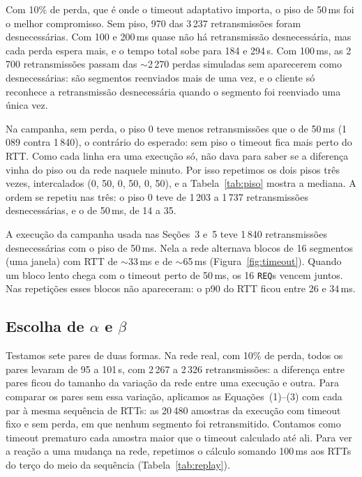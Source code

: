 \documentclass[11pt,a4paper]{article}
\begin{document}
Com 10\% de perda, que é onde o timeout adaptativo importa, o piso de 50\,ms
foi o melhor compromisso. Sem piso, 970 das 3\,237 retransmissões foram
desnecessárias. Com 100 e 200\,ms quase não há retransmissão desnecessária,
mas cada perda espera mais, e o tempo total sobe para 184 e 294\,s. Com
100\,ms, as 2\,700 retransmissões passam das $\sim$2\,270 perdas simuladas sem
aparecerem como desnecessárias: são segmentos reenviados mais de uma vez, e o
cliente só reconhece a retransmissão desnecessária quando o segmento foi
reenviado uma única vez.

Na campanha, sem perda, o piso 0 teve menos retransmissões que o de 50\,ms
(1\,089 contra 1\,840), o contrário do esperado: sem piso o timeout fica mais
perto do RTT. Como cada linha era uma execução só, não dava para saber se a
diferença vinha do piso ou da rede naquele minuto. Por isso repetimos os dois
pisos três vezes, intercalados (0, 50, 0, 50, 0, 50), e a Tabela~\ref{tab:piso}
mostra a mediana. A ordem se repetiu nas três: o piso 0 teve de 1\,203 a
1\,737 retransmissões desnecessárias, e o de 50\,ms, de 14 a 35.

A execução da campanha usada nas Seções~3 e~5 teve 1\,840 retransmissões
desnecessárias com o piso de 50\,ms. Nela a rede alternava blocos de 16
segmentos (uma janela) com RTT de $\sim$33\,ms e de $\sim$65\,ms
(Figura~\ref{fig:timeout}). Quando um bloco lento chega com o timeout perto de
50\,ms, os 16 \texttt{REQ}s vencem juntos. Nas repetições esses blocos não
apareceram: o p90 do RTT ficou entre 26 e 34\,ms.

\subsection{Escolha de \texorpdfstring{$\alpha$}{alfa} e \texorpdfstring{$\beta$}{beta}}

Testamos sete pares de duas formas. Na rede real, com 10\% de perda, todos os
pares levaram de 95 a 101\,s, com 2\,267 a 2\,326 retransmissões: a diferença
entre pares ficou do tamanho da variação da rede entre uma execução e outra.
Para comparar os pares sem essa variação, aplicamos as Equações~(1)--(3) com
cada par à mesma sequência de RTTs: as 20\,480 amostras da execução com timeout
fixo e sem perda, em que nenhum segmento foi retransmitido. Contamos como
timeout prematuro cada amostra maior que o timeout calculado até ali. Para ver
a reação a uma mudança na rede, repetimos o cálculo somando 100\,ms aos RTTs do
terço do meio da sequência (Tabela~\ref{tab:replay}).
\end{document}
